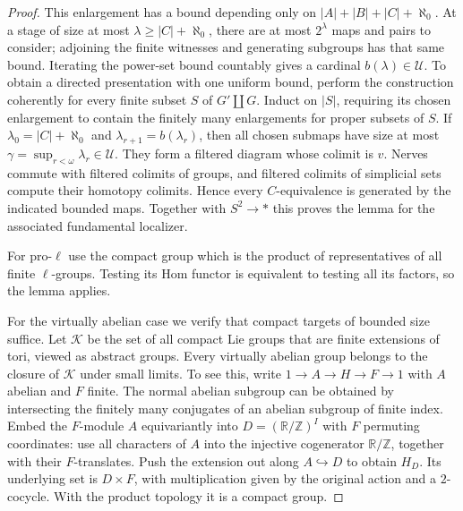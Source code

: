 \begin{proof}
This enlargement has a bound depending only on
$|A|+|B|+|C|+\aleph_0$. At a stage of size at most
$\lambda\geq |C|+\aleph_0$, there are at most
$2^\lambda$ maps and pairs to consider; adjoining
the finite witnesses and generating subgroups
has that same bound. Iterating the power-set bound
countably gives a cardinal $b(\lambda)\in\mathcal U$.
To obtain a directed presentation with one uniform
bound, perform the construction coherently for
every finite subset $S$ of $G'\amalg G$. Induct on
$|S|$, requiring its chosen enlargement to contain
the finitely many enlargements for proper subsets
of $S$. If $\lambda_0=|C|+\aleph_0$ and
$\lambda_{r+1}=b(\lambda_r)$, then all chosen
submaps have size at most
$\gamma=\sup_{r<\omega}\lambda_r\in\mathcal U$.
They form a filtered diagram whose colimit is $v$.
Nerves commute with filtered colimits of groups,
and filtered colimits of simplicial sets compute
their homotopy colimits. Hence every $C$-equivalence
is generated by the indicated bounded maps.
Together with $S^2\to *$ this proves the lemma
for the associated fundamental localizer.

For pro-$\ell$ use the compact group which is
the product of representatives of all finite
$\ell$-groups. Testing its Hom functor is
equivalent to testing all its factors, so the
lemma applies.

For the virtually abelian case we verify that compact targets
of bounded size suffice. Let $\mathcal K$ be the set of all
compact Lie groups that are finite extensions of tori, viewed
as abstract groups. Every virtually abelian group belongs to
the closure of $\mathcal K$ under small limits. To see this,
write
$1\to A\to H\to F\to1$ with $A$ abelian and $F$ finite.
The normal abelian subgroup can be obtained by intersecting
the finitely many conjugates of an abelian subgroup of finite
index. Embed the $F$-module $A$ equivariantly into
$D=(\mathbb R/\mathbb Z)^I$ with $F$ permuting coordinates:
use all characters of $A$ into the injective cogenerator
$\mathbb R/\mathbb Z$, together with their $F$-translates.
Push the extension out along $A\hookrightarrow D$ to obtain
$H_D$. Its underlying set is $D\times F$, with multiplication
given by the original action and a $2$-cocycle. With the
product topology it is a compact group.


\end{proof}
